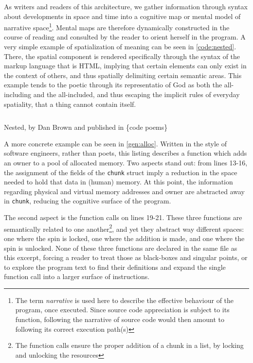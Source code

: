 As writers and readers of this architecture, we gather information through syntax about developments in space and time into a cognitive map or mental model of narrative space\footnote{The term \emph{narrative} is used here to describe the effective behaviour of the program, once executed. Since source code appreciation is subject to its function, following the narrative of source code would then amount to following its correct execution path(s)}. Mental maps are therefore dynamically constructed in the course of reading and consulted by the reader to orient herself in the program. A very simple example of spatialization of meaning can be seen in \ref{code:nested}. There, the spatial component is rendered specifically through the syntax of the markup language that is HTML, implying that certain elements can only exist in the context of others, and thus spatially delimiting certain semantic areas. This example tends to the poetic through its representatio of God as both the all-including and the all-included, and thus escaping the implicit rules of everyday spatiality, that a thing cannot contain itself.

\begin{listing}
    \inputminted[]{html}{./corpus/nested.html}
    \caption{Nested, by Dan Brown and published in \{code poems\} \citep{bertram_code_2012}}
    \label{code:nested}
\end{listing}

A more concrete example can be seen in \ref{gen:alloc}. Written in the style of software engineers, rather than poets, this listing describes a function which adds an owner to a pool of allocated memory. Two aspects stand out: from lines 13-16, the assignment of the fields of the \lstinline{chunk} struct imply a reduction in the space needed to hold that data in (human) memory. At this point, the information regarding physical and virtual memory addresses and owner are abstracted away in  \lstinline{chunk}, reducing the cognitive surface of the program.

The second aspect is the function calls on lines 19-21. These three functions are semantically related to one another\footnote{The function calls ensure the proper addition of a chunk in a list, by locking and unlocking the resources}, and yet they abstract way different spaces: one where the spin is locked, one where the addition is made, and one where the spin is unlocked. None of these three functions are declared in the same file as this excerpt, forcing a reader to treat those as black-boxes and singular points, or to explore the program text to find their definitions and expand the single function call into a larger surface of instructions.


